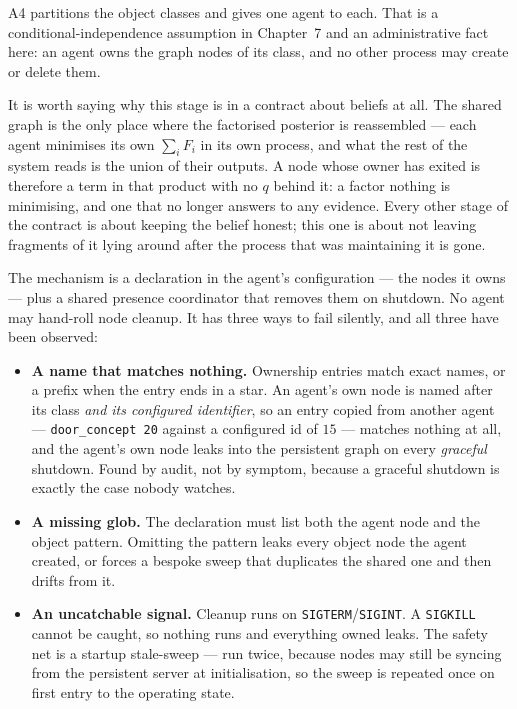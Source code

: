 \documentclass[11pt,a4paper]{report}
\begin{document}
A4 partitions the object classes and gives one agent to each. That is a conditional-independence
assumption in Chapter~7 and an administrative fact here: an agent owns the graph nodes of its class,
and no other process may create or delete them.

It is worth saying why this stage is in a contract about beliefs at all. The shared graph is the only
place where the factorised posterior is reassembled --- each agent minimises its own $\sum_i F_i$ in
its own process, and what the rest of the system reads is the union of their outputs. A node whose
owner has exited is therefore a term in that product with no $q$ behind it: a factor nothing is
minimising, and one that no longer answers to any evidence. Every other stage of the contract is
about keeping the belief honest; this one is about not leaving fragments of it lying around after the
process that was maintaining it is gone.

The mechanism is a declaration in the agent's configuration --- the nodes it owns --- plus a shared
presence coordinator that removes them on shutdown. No agent may hand-roll node cleanup. It has three
ways to fail silently, and all three have been observed:

\begin{itemize}[leftmargin=1.4em,itemsep=3pt]
\item \textbf{A name that matches nothing.} Ownership entries match exact names, or a prefix when the
      entry ends in a star. An agent's own node is named after its class \emph{and its configured
      identifier}, so an entry copied from another agent --- \texttt{door\_concept 20} against a
      configured id of $15$ --- matches nothing at all, and the agent's own node leaks into the
      persistent graph on every \emph{graceful} shutdown. Found by audit, not by symptom, because a
      graceful shutdown is exactly the case nobody watches.
\item \textbf{A missing glob.} The declaration must list both the agent node and the object pattern.
      Omitting the pattern leaks every object node the agent created, or forces a bespoke sweep that
      duplicates the shared one and then drifts from it.
\item \textbf{An uncatchable signal.} Cleanup runs on \texttt{SIGTERM}/\texttt{SIGINT}. A
      \texttt{SIGKILL} cannot be caught, so nothing runs and everything owned leaks. The safety net
      is a startup stale-sweep --- run twice, because nodes may still be syncing from the persistent
      server at initialisation, so the sweep is repeated once on first entry to the operating state.
\end{itemize}
\end{document}
